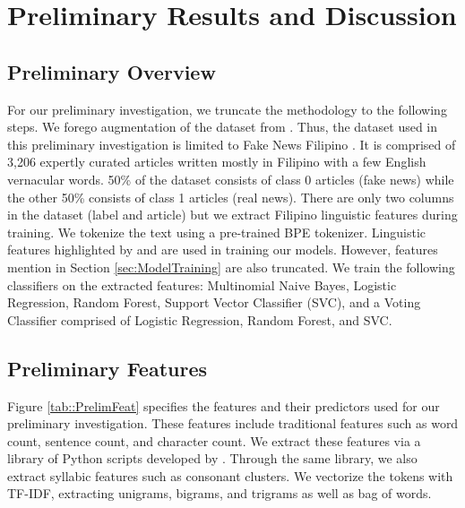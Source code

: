 \chapter{Preliminary Results and Discussion}

\section{Preliminary Overview}

For our preliminary investigation, we truncate the methodology to the following steps. We forego augmentation of the dataset from . Thus, the dataset used in this preliminary investigation is limited to Fake News Filipino \cite{fake-news-filipino}. It is comprised of 3,206 expertly curated articles written mostly in Filipino with a few English vernacular words. 50\% of the dataset consists of class 0 articles (fake news) while the other 50\% consists of class 1 articles (real news). There are only two columns in the dataset (label and article) but we extract Filipino linguistic features during training. We tokenize the text using a pre-trained BPE tokenizer. Linguistic features highlighted by  and  are used in training our models. However, features mention in Section \ref{sec:ModelTraining} are also truncated. We train the following classifiers on the extracted features: Multinomial Naive Bayes, Logistic Regression, Random Forest, Support Vector Classifier (SVC), and a Voting Classifier comprised of Logistic Regression, Random Forest, and SVC.

\section{Preliminary Features}
\label{sec:PrelimFeat}

Figure \ref{tab::PrelimFeat} specifies the features and their predictors used for our preliminary investigation.
These features include traditional features such as word count, sentence count, and character count. We extract these features via a library of Python scripts developed by . Through the same library, we also extract syllabic features such as consonant clusters. We vectorize the tokens with TF-IDF, extracting unigrams, bigrams, and trigrams as well as bag of words.


